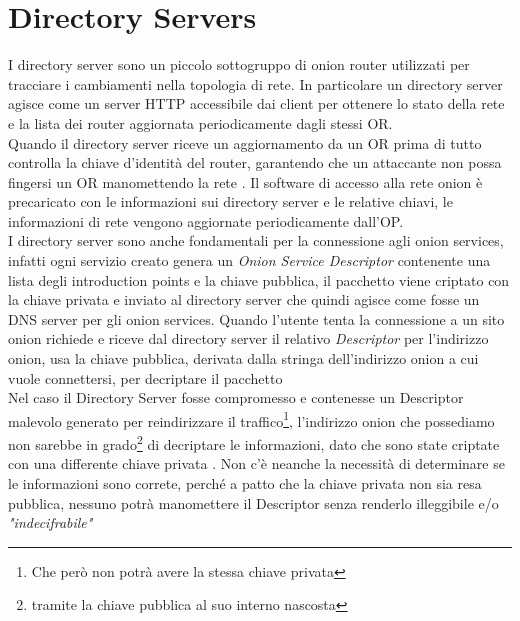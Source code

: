 \newpage
\section{Directory Servers} \label{sec:DirectoryServers}
I directory server sono un piccolo sottogruppo di onion router utilizzati per tracciare i cambiamenti nella topologia di rete. 
In particolare un directory server agisce come un server HTTP accessibile dai client per ottenere lo stato della rete e la lista dei router aggiornata periodicamente dagli stessi OR. \\
Quando il directory server riceve un aggiornamento da un OR prima di tutto controlla la chiave d'identità del router, garantendo che un attaccante non possa fingersi un OR manomettendo la rete \cite{ChaumMixes}. 
Il software di accesso alla rete onion è precaricato con le informazioni sui directory server e le relative chiavi, le informazioni di rete vengono aggiornate periodicamente dall'OP. \\

I directory server sono anche fondamentali per la connessione agli onion services, infatti ogni servizio creato genera un \emph{Onion Service Descriptor} contenente una lista degli introduction points e la chiave pubblica, il pacchetto viene criptato con la chiave privata e inviato al directory server che quindi agisce come fosse un DNS server per gli onion services. 
Quando l'utente tenta la connessione a un sito onion richiede e riceve dal directory server il relativo \emph{Descriptor} per l'indirizzo onion, usa la chiave pubblica, derivata dalla stringa dell'indirizzo onion a cui vuole connettersi, per decriptare il pacchetto \\
Nel caso il Directory Server fosse compromesso e contenesse un Descriptor malevolo generato per reindirizzare il traffico\footnote{Che però non potrà avere la stessa chiave privata}, l'indirizzo onion che possediamo non sarebbe in grado\footnote{tramite la chiave pubblica al suo interno nascosta} di decriptare le informazioni, dato che sono state criptate con una differente chiave privata
\cite{OnionServicesOverview}.
Non c'è neanche la necessità di determinare se le informazioni sono correte, perché a patto che la chiave privata non sia resa pubblica, nessuno potrà manomettere il Descriptor senza renderlo illeggibile e/o \emph{"indecifrabile"}
